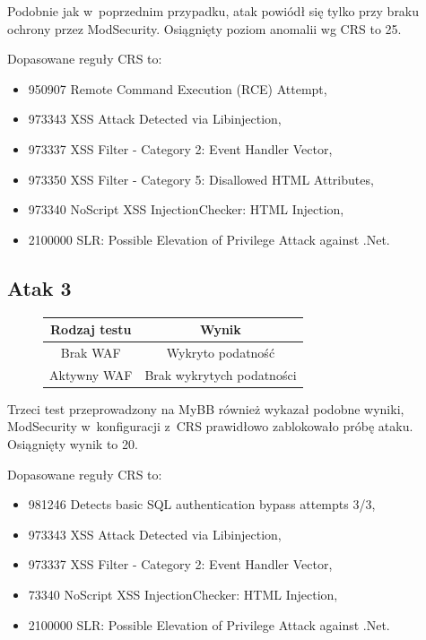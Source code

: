 \documentclass[12pt,a4paper,polish,thesis]{dcsbook}
\begin{document}
Podobnie jak w~poprzednim przypadku, atak powiódł się tylko przy braku ochrony przez ModSecurity. Osiągnięty poziom anomalii wg CRS to 25.

Dopasowane reguły CRS to:
\begin{itemize}
\item 950907	Remote Command Execution (RCE) Attempt,
\item 973343	XSS Attack Detected via Libinjection,
\item 973337	XSS Filter - Category 2: Event Handler Vector,
\item 973350	XSS Filter - Category 5: Disallowed HTML Attributes,
\item 973340	NoScript XSS InjectionChecker: HTML Injection,
\item 2100000	SLR: Possible Elevation of Privilege Attack against .Net.
\end{itemize}


\FloatBarrier

\subsection*{Atak 3}
\FloatBarrier
\begin{figure}[!htbp]
\centering
\begin{tabular}{|c|c|}
\hline 
\textbf{Rodzaj testu} & \textbf{Wynik} \\ 
\hline 
Brak WAF & Wykryto podatność \\ 
\hline 
Aktywny WAF & Brak wykrytych podatności \\ 
\hline 
\end{tabular} 

\end{figure}

Trzeci test przeprowadzony na MyBB również wykazał podobne wyniki, ModSecurity w~konfiguracji z~CRS prawidłowo zablokowało próbę ataku. Osiągnięty wynik to 20.

Dopasowane reguły CRS to:
\begin{itemize}
\item 981246	Detects basic SQL authentication bypass attempts 3/3,
\item 973343	XSS Attack Detected via Libinjection,
\item 973337	XSS Filter - Category 2: Event Handler Vector,
\item 73340	NoScript XSS InjectionChecker: HTML Injection,
\item 2100000	SLR: Possible Elevation of Privilege Attack against .Net.
\end{itemize}
\end{document}

